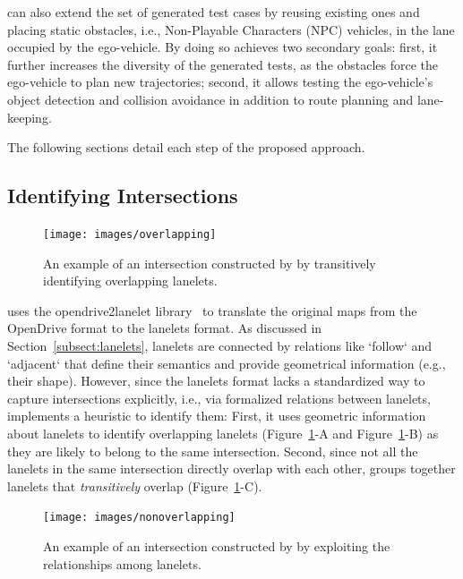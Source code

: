 \documentclass[conference]{IEEEtran}
\begin{document}
\tool can also extend the set of generated test cases by reusing existing ones and placing static obstacles, i.e., Non-Playable Characters (NPC) vehicles, in the lane occupied by the ego-vehicle. By doing so \tool achieves two secondary goals: first, it further increases the diversity of the generated tests, as the obstacles force the ego-vehicle to plan new trajectories; second, it allows testing the ego-vehicle's object detection and collision avoidance in addition to route planning and lane-keeping.

The following sections detail each step of the proposed approach.

\subsection{Identifying Intersections}

\begin{figure}
  \centering
    \texttt{[image: images/overlapping]}
  \caption{An example of an intersection constructed by \tool by transitively identifying overlapping lanelets.}
  \label{fig:overlapping}
\end{figure}

\tool uses the opendrive2lanelet library~\cite{althoff2018automatic} to translate the original maps from the OpenDrive format to the lanelets format. As discussed in Section~\ref{subsect:lanelets}, lanelets are connected by relations like `follow` and `adjacent` that define their semantics and provide geometrical information (e.g., their shape). 
However, since the lanelets format lacks a standardized way to capture intersections explicitly, i.e., via formalized relations between lanelets, \tool implements a heuristic to identify them: 
First, it uses geometric information about lanelets to identify overlapping lanelets (\mbox{Figure~\ref{fig:overlapping}-A} and \mbox{Figure~\ref{fig:overlapping}-B}) as they are likely to belong to the same intersection. Second, since not all the lanelets in the same intersection directly overlap with each other, \tool groups together lanelets that \emph{transitively} overlap (\mbox{Figure~\ref{fig:overlapping}-C}).


\begin{figure}
  \centering
    \texttt{[image: images/nonoverlapping]}
  \caption{An example of an intersection constructed by \tool by exploiting the relationships among lanelets.}
  \label{fig:nonoverlapping}
\end{figure}
\end{document}
